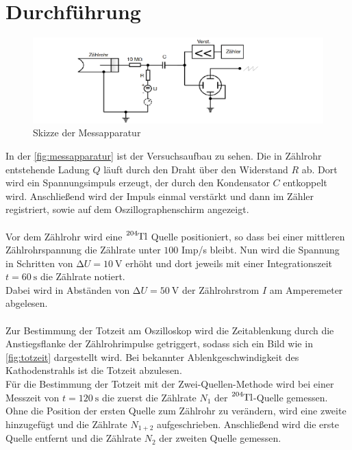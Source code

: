 \section{Durchführung}
\label{sec:Durchführung}
\begin{figure}
    \centering
    \includegraphics[width=\textwidth]{content/messapparatur.pdf}
    \caption{Skizze der Messapparatur \cite{anleitung}}
    \label{fig:messapparatur}
\end{figure}

In der \autoref{fig:messapparatur} ist der Versuchsaufbau zu sehen.
Die in Zählrohr entstehende Ladung $Q$ läuft durch den Draht über den Widerstand $R$ ab.
Dort wird ein Spannungsimpuls erzeugt, der durch den Kondensator $C$ entkoppelt wird.
Anschließend wird der Impuls einmal verstärkt und dann im Zähler registriert, sowie auf dem Oszillographenschirm angezeigt.\\
\\
Vor dem Zählrohr wird eine $\ce{^{204}Tl}$ Quelle positioniert, so dass bei einer mittleren Zählrohrspannung die Zählrate unter  $\num{100}$ Imp/s bleibt.
Nun wird die Spannung in Schritten von $\increment U = \SI{10}{\volt}$ erhöht und dort jeweils mit einer Integrationszeit $t=\SI{60}{\second}$ die Zählrate notiert.\\
Dabei wird in Abständen von $\increment U = \SI{50}{\volt}$ der Zählrohrstrom $I$ am Amperemeter abgelesen.\\
\\
Zur Bestimmung der Totzeit am Oszilloskop wird die Zeitablenkung durch die Anstiegsflanke der Zählrohrimpulse getriggert, sodass sich ein Bild wie in \autoref{fig:totzeit} dargestellt wird.
Bei bekannter Ablenkgeschwindigkeit des Kathodenstrahls ist die Totzeit abzulesen. \\
Für die Bestimmung der Totzeit mit der Zwei-Quellen-Methode wird bei einer Messzeit von $t=\SI{120}{\second}$ die zuerst die Zählrate $N_1$ der $\ce{^{204}Tl}$-Quelle gemessen.
Ohne die Position der ersten Quelle zum Zählrohr zu verändern, wird eine zweite hinzugefügt und die Zählrate $N_{1+2}$ aufgeschrieben.
Anschließend wird die erste Quelle entfernt und die Zählrate $N_2$ der zweiten Quelle gemessen.